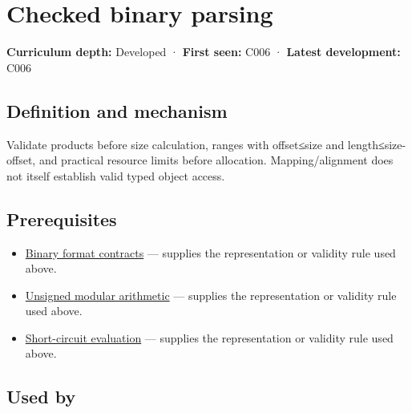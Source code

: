 \hypertarget{appendix-652d81568de9}{}\label{referencestart:appendix-652d81568de9}
\section{Checked binary parsing}\label{appendix-652d81568de9-checked-binary-parsing}

\hypertarget{appendix-652d81568de9-checked-binary-parsing}{}

\textbf{Curriculum depth:} Developed · \textbf{First seen:} C006 · \textbf{Latest development:} C006

\begin{allmightroledefinition}

\subsection{Definition and mechanism}\label{appendix-652d81568de9-definition-and-mechanism}

\hypertarget{appendix-652d81568de9-definition-and-mechanism}{}

Validate products before size calculation, ranges with offset≤size and length≤size-offset, and practical resource limits before allocation. Mapping/alignment does not itself establish valid typed object access.

\end{allmightroledefinition}

\subsection{Prerequisites}\label{appendix-652d81568de9-prerequisites}

\hypertarget{appendix-652d81568de9-prerequisites}{}

\begin{itemize}
\tightlist
\item
  \hyperref[appendix-590bbb2424c1]{Binary format contracts} --- supplies the representation or validity rule used above.
\item
  \hyperref[appendix-c99977d88b33]{Unsigned modular arithmetic} --- supplies the representation or validity rule used above.
\item
  \hyperref[appendix-2e245a6fa8d3]{Short-circuit evaluation} --- supplies the representation or validity rule used above.
\end{itemize}

\subsection{Used by}\label{appendix-652d81568de9-used-by}

